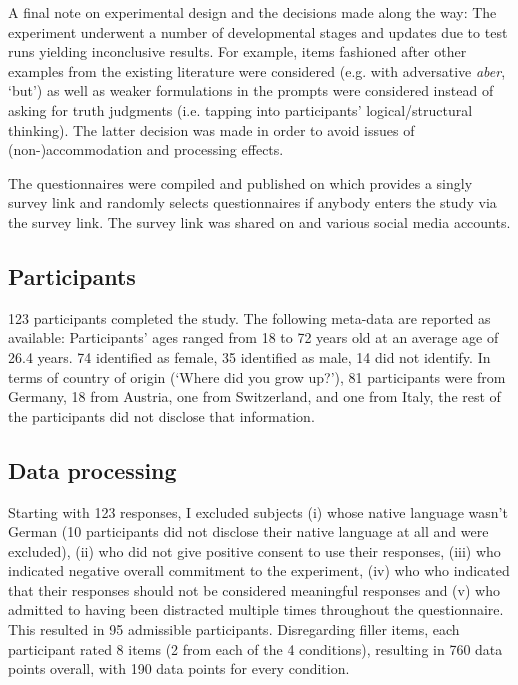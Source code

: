 \documentclass[output=paper,
modfonts
]{langscibook}
\begin{document}
A final note on experimental design and the decisions made along the way: The experiment underwent a number of developmental stages and updates due to test runs yielding inconclusive results. For example, items fashioned after other examples from the existing literature were considered (e.g.  with adversative \textit{aber}, `but') as well as weaker formulations in the prompts were considered instead of asking for truth judgments (i.e. tapping into participants' logical/structural thinking). The latter decision was made in order to avoid issues of (non-)accommodation and processing effects.

The questionnaires were compiled and published on \citet{sosci_website} which provides a singly survey link and randomly selects questionnaires if anybody enters the study via the survey link. The survey link was shared on \citet{survey_circle_website} and various social media accounts. 

\subsection{Participants}

123 participants completed the study. The following meta-data are reported as available: Participants' ages ranged from 18 to 72 years old at an average age of 26.4 years. 74 identified as female, 35 identified as male, 14 did not identify. In terms of country of origin (`Where did you grow up?'), 81 participants were from Germany, 18 from Austria, one from Switzerland, and one from Italy, the rest of the participants did not disclose that information.

\subsection{Data processing}

Starting with 123 responses, I excluded subjects (i) whose native language wasn't German (10 participants did not disclose their native language at all and were excluded), (ii) who did not give positive consent to use their responses, (iii) who indicated negative overall commitment to the experiment, (iv) who who indicated that their responses should not be considered meaningful responses and (v) who admitted to having been distracted multiple times throughout the questionnaire. This resulted in 95 admissible participants. Disregarding filler items, each participant rated 8 items (2 from each of the 4 conditions), resulting in 760 data points overall, with 190 data points for every condition.
\end{document}
